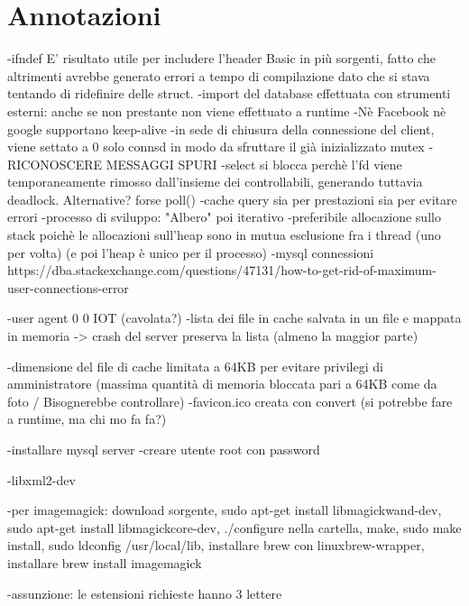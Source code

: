 \documentclass[a4paper, titlepage]{article}
\begin{document}
	\section{Annotazioni}
	\begin{flushleft}
		-ifndef E' risultato utile per includere l'header Basic in più sorgenti, fatto che altrimenti avrebbe generato errori a tempo di compilazione dato che si stava tentando di ridefinire delle struct.\newline
		-import del database effettuata con strumenti esterni: anche se non prestante non viene effettuato a runtime
		-Nè Facebook nè google supportano keep-alive
		-in sede di chiusura della connessione del client, viene settato a 0 solo connsd in modo da sfruttare il già inizializzato mutex
		-RICONOSCERE MESSAGGI SPURI
		-select si blocca perchè l'fd viene temporaneamente rimosso dall'insieme dei controllabili, generando tuttavia deadlock. Alternative? forse poll()
		-cache query sia per prestazioni sia per evitare errori
		-processo di sviluppo: "Albero" poi iterativo
		-preferibile allocazione sullo stack poichè le allocazioni sull'heap sono in mutua esclusione fra i thread (uno per volta) (e poi l'heap è unico per il processo)
		-mysql connessioni https://dba.stackexchange.com/questions/47131/how-to-get-rid-of-maximum-user-connections-error
		
		-user agent 0 0 IOT (cavolata?)
		-lista dei file in cache salvata in un file e mappata in memoria -> crash del server preserva la lista (almeno la maggior parte)
		
		-dimensione del file di cache limitata a 64KB per evitare privilegi di amministratore (massima quantità di memoria bloccata pari a 64KB come da foto / Bisognerebbe controllare)
		-favicon.ico creata con convert (si potrebbe fare a runtime, ma chi mo fa fa?)
		
		-installare mysql server
		-creare utente root con password
		
		-libxml2-dev
		
		-per imagemagick: download sorgente, sudo apt-get install libmagickwand-dev, sudo apt-get install libmagickcore-dev, ./configure nella cartella, make, sudo make install, sudo ldconfig /usr/local/lib, installare brew con linuxbrew-wrapper, installare brew install imagemagick

		-assunzione: le estensioni richieste hanno 3 lettere
	\end{flushleft}
	
\end{document}
